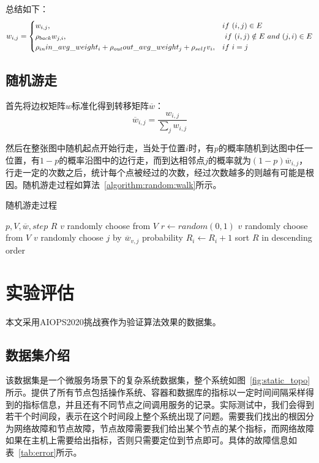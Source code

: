 总结如下：
\begin{equation*}
w_{i,j} = \begin{cases} w_{i,j}, & if\ (i,j) \in E \cr \rho_{back} w_{j,i}, &\ if\ (i,j) \notin E\ and\  (j,i) \in E \cr \rho_{in} in\_avg\_weight_{i} + \rho_{out} out\_avg\_weight_{j}+ \rho_{self}  v_i, & if\ i=j \end{cases}
\end{equation*}

\subsection{随机游走}
首先将边权矩阵$w$标准化得到转移矩阵$\overline{w}$：
\begin{equation*}
  \overline{w}_{i,j} = \frac{w_{i,j}}{\sum_jw_{i,j}}
\end{equation*}

然后在整张图中随机起点开始行走，当处于位置$i$时，有$p$的概率随机到达图中任一位置，有$1-p$的概率沿图中的边行走，而到达相邻点$j$的概率就为$(1-p)\overline{w}_{i,j}$，行走一定的次数之后，统计每个点被经过的次数，经过次数越多的则越有可能是根因。随机游走过程如算法~\ref{algorithm:random:walk}所示。

\begin{algorithm}
  \caption{随机游走过程}
  \begin{algorithmic}[1]
      \Require $p,V,\overline{w},step$
      \Ensure $R$
      \State $v$ \gets randomly choose from $V$
      \Repeat
      \State $r \gets random(0,1)$
        \State $v$ \gets randomly choose from $V$
      \Else
        \State $v$ \gets randomly choose $j$ by $\overline{w}_{v,j}$ probability
      \EndIf
      \State $R_i \gets R_i + 1 $
      \State sort $R$ in descending order
  \end{algorithmic}
  \label{algorithm:random:walk}
\end{algorithm}
\section{实验评估}
本文采用AIOPS2020挑战赛作为验证算法效果的数据集。

\subsection{数据集介绍}

该数据集是一个微服务场景下的复杂系统数据集，整个系统如图~\ref{fig:static_topo}所示。提供了所有节点包括操作系统、容器和数据库的指标以一定时间间隔采样得到的指标信息，并且还有不同节点之间调用服务的记录。实际测试中，我们会得到若干个时间段，表示在这个时间段上整个系统出现了问题。需要我们找出的根因分为网络故障和节点故障，节点故障需要我们给出某个节点的某个指标，而网络故障如果在主机上需要给出指标，否则只需要定位到节点即可。具体的故障信息如表~\ref{tab:error}所示。

